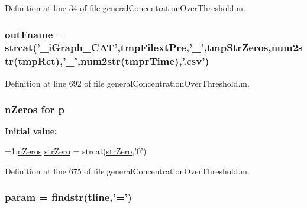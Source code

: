 Definition at line 34 of file general\-Concentration\-Over\-Threshold.\-m.

\hypertarget{a00028_abf4ae8c34e865742e8ee979ed6e03384}{
\subsubsection[{out\-Fname}]{\setlength{\rightskip}{0pt plus 5cm}out\-Fname = strcat('\-\_\-i\-Graph\-\_\-\-C\-A\-T',tmp\-Filext\-Pre,'\-\_\-',{\bf tmp\-Str\-Zeros},num2str(tmp\-Rct),'\-\_\-',num2str(tmpr\-Time),'.csv')}}\label{a00028_abf4ae8c34e865742e8ee979ed6e03384}


Definition at line 692 of file general\-Concentration\-Over\-Threshold.\-m.

\hypertarget{a00028_aa2b4c35904308d35fc5d606a429e608d}{
\subsubsection[{p}]{ {\bf n\-Zeros} for p}}\label{a00028_aa2b4c35904308d35fc5d606a429e608d}
{\bfseries Initial value\-:}
\begin{DoxyCode}
=1:\hyperlink{a00028_ac4353d99277795cadf898255e2c73c71}{nZeros}
            \hyperlink{a00025_ab253e75f6224bf843e7a5ff2fb472e7d}{strZero} = strcat(\hyperlink{a00025_ab253e75f6224bf843e7a5ff2fb472e7d}{strZero},\textcolor{charliteral}{'0'})
\end{DoxyCode}


Definition at line 675 of file general\-Concentration\-Over\-Threshold.\-m.

\hypertarget{a00028_a51f20d6b1b54a2eee3be0e8adc96a0ae}{
\subsubsection[{param}]{\setlength{\rightskip}{0pt plus 5cm}param = findstr({\bf tline},'=')}}\label{a00028_a51f20d6b1b54a2eee3be0e8adc96a0ae}



